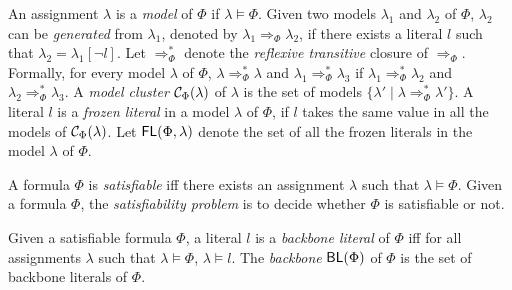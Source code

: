 An assignment $\lambda$ is a \emph{model} of $\Phi$ if $\lambda\models \Phi$.
Given two models $\lambda_1$ and $\lambda_2$ of $\Phi$, $\lambda_2$ can be \emph{generated} from $\lambda_1$, denoted by $\lambda_1\Rightarrow_\Phi\lambda_2$, if there exists a literal $l$ such that $\lambda_2=\lambda_1[\neg l]$.
Let $\Rightarrow^*_\Phi$ denote the \emph{reflexive transitive} closure of $\Rightarrow_\Phi$.
Formally, for every model $\lambda$ of $\Phi$, $\lambda\Rightarrow^*_\Phi\lambda$ and $\lambda_1\Rightarrow^*_\Phi\lambda_3$ if $\lambda_1\Rightarrow^*_\Phi\lambda_2$ and $\lambda_2\Rightarrow^*_\Phi\lambda_3$.
A \emph{model cluster} $\mathcal{C}_\Phi(\lambda)$ of $\lambda$ is the set of models $\{\lambda'\mid \lambda\Rightarrow^*_\Phi\lambda'\}$.
A literal $l$ is a \emph{frozen literal} in a model $\lambda$ of $\Phi$,
if $l$ takes the same value in all the models of $\mathcal{C}_\Phi(\lambda)$. Let $\textsf{FL}(\Phi,\lambda)$ denote the set of all the frozen literals
in the model $\lambda$ of $\Phi$. %


A formula $\Phi$ is \emph{satisfiable} iff there exists an assignment $\lambda$ such that $\lambda\models \Phi$.
Given a formula $\Phi$, the \emph{satisfiability problem} is to decide whether $\Phi$ is satisfiable or not.

\smallskip

\begin{definition}[Backbone]
\label{def:backbone}
Given a satisfiable formula $\Phi$, a literal $l$ is a \emph{backbone literal} of $\Phi$ iff for all assignments $\lambda$ such that $\lambda\models\Phi$,
$\lambda\models l$. The \emph{backbone} $\textsf{BL}(\Phi)$ of $\Phi$ is the set of backbone literals of $\Phi$.
\end{definition}



